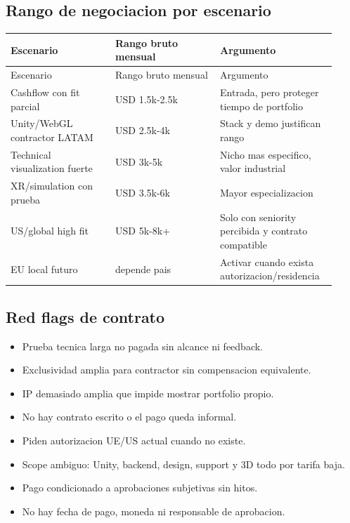 \subsection{Rango de negociacion por escenario}


\begin{center}
\scriptsize
\begin{longtable}{>{\raggedright\arraybackslash}p{0.305\linewidth} >{\raggedright\arraybackslash}p{0.305\linewidth} >{\raggedright\arraybackslash}p{0.305\linewidth}}
\toprule
Escenario & Rango bruto mensual & Argumento \\
\midrule
\endfirsthead
\toprule
Escenario & Rango bruto mensual & Argumento \\
\midrule
\endhead
Cashflow con fit parcial & USD 1.5k-2.5k & Entrada, pero proteger tiempo de portfolio \\
Unity/WebGL contractor LATAM & USD 2.5k-4k & Stack y demo justifican rango \\
Technical visualization fuerte & USD 3k-5k & Nicho mas especifico, valor industrial \\
XR/simulation con prueba & USD 3.5k-6k & Mayor especializacion \\
US/global high fit & USD 5k-8k+ & Solo con seniority percibida y contrato compatible \\
EU local futuro & depende pais & Activar cuando exista autorizacion/residencia \\
\bottomrule
\end{longtable}
\end{center}


\subsection{Red flags de contrato}


\begin{itemize}
\item Prueba tecnica larga no pagada sin alcance ni feedback.
\item Exclusividad amplia para contractor sin compensacion equivalente.
\item IP demasiado amplia que impide mostrar portfolio propio.
\item No hay contrato escrito o el pago queda informal.
\item Piden autorizacion UE/US actual cuando no existe.
\item Scope ambiguo: Unity, backend, design, support y 3D todo por tarifa baja.
\item Pago condicionado a aprobaciones subjetivas sin hitos.
\item No hay fecha de pago, moneda ni responsable de aprobacion.
\end{itemize}


